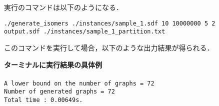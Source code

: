 \documentclass[11pt,titlepage,dvipdfmx,twoside]{jarticle}
\begin{document}
実行のコマンドは以下のようになる．

\bigskip


{\tt ./generate\_isomers ./instances/sample\_1.sdf 10 10000000 5 2} \\
 {\tt output.sdf ./instances/sample\_1\_partition.txt}	


\bigskip

このコマンドを実行して場合，以下のような出力結果が得られる．

\begin{oframed}
{\bf ターミナルに実行結果の具体例}\\\\
{\tt A lower bound on the number of graphs = 72\\
Number of generated graphs = 72\\
Total time : 0.00649s.}
\end{oframed}
\end{document}
